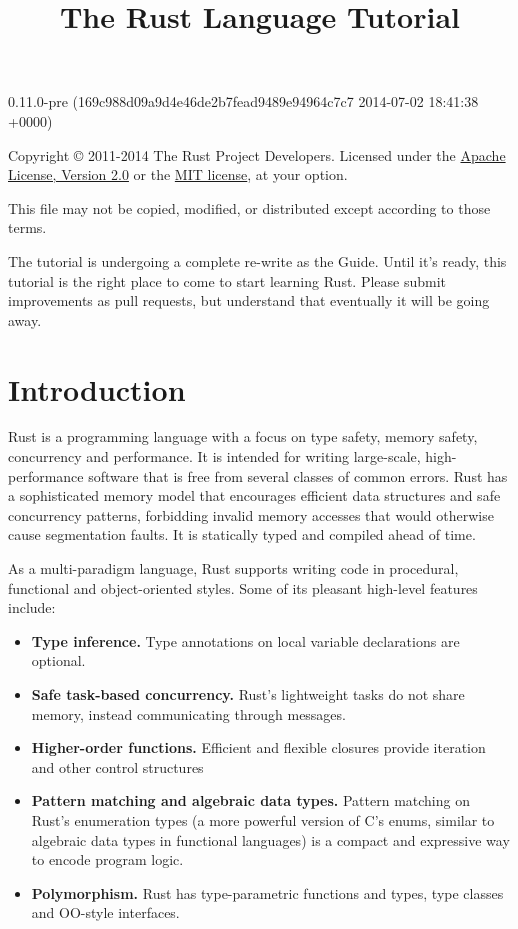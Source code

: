 \documentclass[]{article}
\title{The Rust Language Tutorial}
\begin{document}
\maketitle

0.11.0-pre (169c988d09a9d4e46de2b7fead9489e94964c7c7 2014-07-02 18:41:38 +0000)

Copyright © 2011-2014 The Rust Project Developers. Licensed under the
\href{http://www.apache.org/licenses/LICENSE-2.0}{Apache License,
Version 2.0} or the \href{http://opensource.org/licenses/MIT}{MIT
license}, at your option.

This file may not be copied, modified, or distributed except according
to those terms.

{
\hypersetup{linkcolor=black}
\setcounter{tocdepth}{3}
\tableofcontents
}
The tutorial is undergoing a complete re-write as the Guide. Until it's
ready, this tutorial is the right place to come to start learning Rust.
Please submit improvements as pull requests, but understand that
eventually it will be going away.

\section{Introduction}\label{introduction}

Rust is a programming language with a focus on type safety, memory
safety, concurrency and performance. It is intended for writing
large-scale, high-performance software that is free from several classes
of common errors. Rust has a sophisticated memory model that encourages
efficient data structures and safe concurrency patterns, forbidding
invalid memory accesses that would otherwise cause segmentation faults.
It is statically typed and compiled ahead of time.

As a multi-paradigm language, Rust supports writing code in procedural,
functional and object-oriented styles. Some of its pleasant high-level
features include:

\begin{itemize}
\itemsep1pt\parskip0pt
\item
  \textbf{Type inference.} Type annotations on local variable
  declarations are optional.
\item
  \textbf{Safe task-based concurrency.} Rust's lightweight tasks do not
  share memory, instead communicating through messages.
\item
  \textbf{Higher-order functions.} Efficient and flexible closures
  provide iteration and other control structures
\item
  \textbf{Pattern matching and algebraic data types.} Pattern matching
  on Rust's enumeration types (a more powerful version of C's enums,
  similar to algebraic data types in functional languages) is a compact
  and expressive way to encode program logic.
\item
  \textbf{Polymorphism.} Rust has type-parametric functions and types,
  type classes and OO-style interfaces.
\end{itemize}
\end{document}
